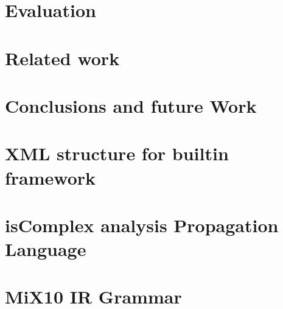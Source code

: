 \documentclass[MSc,twoside,openright]{Thesis}
\newcommand{\matlab}{{\sc Matlab}\xspace}
\newcommand{\mixten}{{\sc MiX10}\xspace}
\begin{document}
\chapter{Evaluation} \label{chap:Evaluation}


\chapter{Related work} \label{chap:Related}


\chapter{Conclusions and future Work} \label{chap:Conclusions}




%

%



\appendix %


\chapter{XML structure for builtin framework} \label{chap:Builtinxml}



%

\chapter{isComplex analysis Propagation Language} \label{chap:Iscomplexprop}


\chapter{\mixten IR Grammar} \label{chap:irgrammar}





%
%
\end{document}

